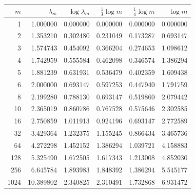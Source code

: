 \begin{tabular}{rrrrrr}\toprule $m$ & $\lambda_m$ & $\log\lambda_m$ & $\tfrac13\log m$ & $\tfrac14\log m$ & $\log m$\\\midrule
1 & 1.000000 & 0.000000 & 0.000000 & 0.000000 & 0.000000\\
2 & 1.353210 & 0.302480 & 0.231049 & 0.173287 & 0.693147\\
3 & 1.574743 & 0.454092 & 0.366204 & 0.274653 & 1.098612\\
4 & 1.742959 & 0.555584 & 0.462098 & 0.346574 & 1.386294\\
5 & 1.881239 & 0.631931 & 0.536479 & 0.402359 & 1.609438\\
6 & 2.000000 & 0.693147 & 0.597253 & 0.447940 & 1.791759\\
8 & 2.199280 & 0.788130 & 0.693147 & 0.519860 & 2.079442\\
10 & 2.365019 & 0.860786 & 0.767528 & 0.575646 & 2.302585\\
16 & 2.750859 & 1.011913 & 0.924196 & 0.693147 & 2.772589\\
32 & 3.429364 & 1.232375 & 1.155245 & 0.866434 & 3.465736\\
64 & 4.272298 & 1.452152 & 1.386294 & 1.039721 & 4.158883\\
128 & 5.325490 & 1.672505 & 1.617343 & 1.213008 & 4.852030\\
256 & 6.645784 & 1.893983 & 1.848392 & 1.386294 & 5.545177\\
1024 & 10.389802 & 2.340825 & 2.310491 & 1.732868 & 6.931472\\
\bottomrule\end{tabular}
